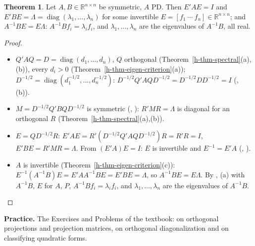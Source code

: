 \documentclass[12pt]{article}
\newcommand{\R}{\mathbb R}
\DeclareMathOperator{\diag}{diag}
\theoremstyle{definition}
\newtheorem{theorem}{Theorem}
\begin{document}
\begin{theorem}\label{h-thm-pd-simdiag}
Let \(A,B\in\R^{n\times n}\) be symmetric, \(A\) PD. Then \(E'AE=I\) and \(E'BE=\Lambda=\diag(\lambda_1,\dots,\lambda_n)\)
for some invertible \(E=[f_1\ \cdots\ f_n]\in\R^{n\times n}\); and \(A^{-1}BE=E\Lambda\): \(A^{-1}Bf_i=\lambda_if_i\), and
\(\lambda_1,\dots,\lambda_n\) are the eigenvalues of \(A^{-1}B\), all real.
\end{theorem}
\begin{proof}
\begin{itemize}
\item \(Q'AQ=D=\diag(d_1,\dots,d_n)\), \(Q\) orthogonal (Theorem~\ref{h-thm-spectral}(a),(b)), every \(d_i>0\)
(Theorem~\ref{h-thm-eigen-criterion}(a)); \(D^{-1/2}=\diag(d_1^{-1/2},\dots,d_n^{-1/2})\):
\(D^{-1/2}Q'AQD^{-1/2}=D^{-1/2}DD^{-1/2}=I\) (, (b)).
\item \(M=D^{-1/2}Q'BQD^{-1/2}\) is symmetric (, ): \(R'MR=\Lambda\) is diagonal for an orthogonal \(R\)
(Theorem~\ref{h-thm-spectral}(a),(b)).
\item \(E=QD^{-1/2}R\): \(E'AE=R'(D^{-1/2}Q'AQD^{-1/2})R=R'R=I\), \(E'BE=R'MR=\Lambda\). From \((E'A)E=I\):
\(E\) is invertible and \(E^{-1}=E'A\) (, ).
\item \(A\) is invertible (Theorem~\ref{h-thm-eigen-criterion}(c)): \(E^{-1}(A^{-1}B)E=E'AA^{-1}BE=E'BE=\Lambda\), so
\(A^{-1}BE=E\Lambda\). By , (a) with \(A^{-1}B\), \(E\) for \(A\), \(P\), \(A^{-1}Bf_i=\lambda_if_i\), and
\(\lambda_1,\dots,\lambda_n\) are the eigenvalues of \(A^{-1}B\).\qedhere
\end{itemize}
\end{proof}

\bigskip
\textbf{Practice.} The Exercises and Problems of the textbook:  on orthogonal projections and projection
matrices,  on orthogonal diagonalization and on classifying quadratic forms.
\end{document}
